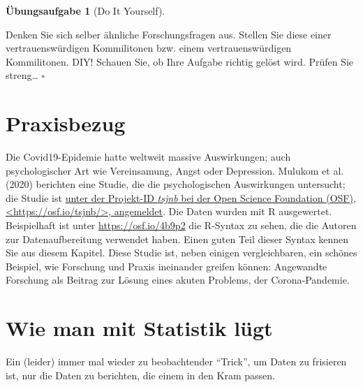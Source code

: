 \documentclass[
  letterpaper,
  twoside,
  open=any]{scrbook}
\theoremstyle{definition}
\newtheorem{exercise}{Übungsaufgabe}[chapter]
\theoremstyle{definition}
\theoremstyle{definition}
\theoremstyle{remark}
\begin{document}
\begin{exercise}[Do It
Yourself]\protect\hypertarget{exr-diy}{}\label{exr-diy}

Denken Sie sich selber ähnliche Forschungsfragen aus. Stellen Sie diese
einer vertrauenswürdigen Kommilitonen bzw. einem vertrauenswürdigen
Kommilitonen. DIY! Schauen Sie, ob Ihre Aufgabe richtig gelöst wird.
Prüfen Sie streng\ldots{} \(\square\)

\end{exercise}

\section{Praxisbezug}\label{praxisbezug-2}

Die Covid19-Epidemie hatte weltweit massive Auswirkungen; auch
psychologischer Art wie Vereinsamung, Angst oder Depression. Mulukom et
al. (2020) berichten eine Studie, die die psychologischen Auswirkungen
untersucht; die Studie ist \href{https://osf.io/tsjnb/}{unter der
Projekt-ID \emph{tsjnb} bei der Open Science Foundation (OSF),
\textless https://osf.io/tsjnb/\textgreater, angemeldet}. Die Daten
wurden mit R ausgewertet. Beispielhaft ist unter
\url{https://osf.io/4b9p2} die R-Syntax zu sehen, die die Autoren zur
Datenaufbereitung verwendet haben. Einen guten Teil dieser Syntax kennen
Sie aus diesem Kapitel. Diese Studie ist, neben einigen vergleichbaren,
ein schönes Beispiel, wie Forschung und Praxis ineinander greifen
können: Angewandte Forschung als Beitrag zur Lösung eines akuten
Problems, der Corona-Pandemie.

\section{Wie man mit Statistik
lügt}\label{wie-man-mit-statistik-luxfcgt-1}

Ein (leider) immer mal wieder zu beobachtender \enquote{Trick}, um Daten
zu frisieren ist, nur die Daten zu berichten, die einem in den Kram
passen.
\end{document}
